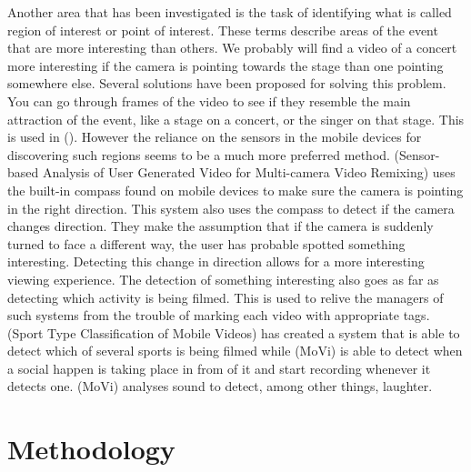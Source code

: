 \documentclass[conference]{IEEEtran}
\begin{document}
Another area that has been investigated is the task of identifying what is called region of interest or point of interest. These terms describe areas of the event that are more interesting than others. We probably will find a video of a concert more interesting if the camera is pointing towards the stage than one pointing somewhere else. Several solutions have been proposed for solving this problem. You can go through frames of the video to see if they resemble the main attraction of the event, like a stage on a concert, or the singer on that stage. This is used in (). However the reliance on the sensors in the mobile devices for discovering such regions seems to be a much more preferred method. (Sensor-based Analysis of User Generated Video for Multi-camera Video Remixing) uses the built-in compass found on mobile devices to make sure the camera is pointing in the right direction. This system also uses the compass to detect if the camera changes direction. They make the assumption that if the camera is suddenly turned to face a different way, the user has probable spotted something interesting. Detecting this change in direction allows for a more interesting viewing experience. 
The detection of something interesting also goes as far as detecting which activity is being filmed.  This is used to relive the managers of such systems from the trouble of marking each video with appropriate tags. (Sport Type Classification of Mobile Videos) has created a system that is able to detect which of several sports is being filmed while (MoVi) is able to detect when a social happen is taking place in from of it and start recording whenever it detects one. (MoVi) analyses sound to detect, among other things, laughter. 

\section{Methodology}
\end{document}
